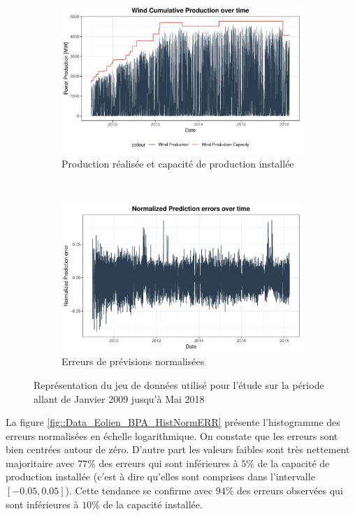 \documentclass[12pt, french]{report}
\begin{document}
\begin{figure}[htbp]
\begin{center}
\begin{subfigure}[b]{0.45\textwidth}
	\includegraphics[width=\textwidth]{Images/Data/Eolien/BPA/Normalize.pdf}
	\caption{Production réalisée et capacité de production installée}
	\label{fig::PredErrors_all}
\end{subfigure}
~
\begin{subfigure}[b]{0.45\textwidth}
	\includegraphics[width=\textwidth]{Images/Data/Eolien/BPA/NormWindErrs_All.pdf}
	\caption{Erreurs de prévisions normalisées }
	\label{fig:Data_BPA_WholeNorm}
\end{subfigure}
\caption{Représentation du jeu de données utilisé pour l'étude sur la période  allant de Janvier 2009 jusqu'à Mai 2018 }
\label{fig::DataPres}	
\end{center}
\end{figure}

La figure \ref{fig::Data_Eolien_BPA_HistNormERR} présente l'histogramme des erreurs normalisées en échelle logarithmique. On constate que les erreurs sont bien centrées autour de zéro. D'autre part les valeurs faibles sont très nettement majoritaire avec $77 \%$ des erreurs qui sont inférieures à $5 \%$ de la capacité de production installée (c'est à dire qu'elles sont comprises dans l'intervalle $[-0.05,0.05]$). Cette tendance se confirme avec $94 \%$ des erreurs observées qui sont inférieures à $10 \%$ de la capacité installée.
\end{document}
